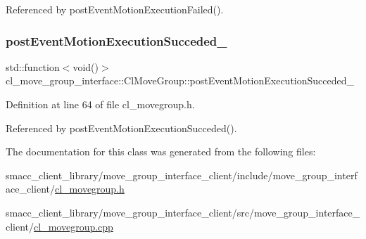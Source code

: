 Referenced by post\+Event\+Motion\+Execution\+Failed().

\mbox{\label{classcl__move__group__interface_1_1ClMoveGroup_a1e95dacf3393a4e4eff40395e8edfccd}} 
\subsubsection{\texorpdfstring{post\+Event\+Motion\+Execution\+Succeded\+\_\+}{postEventMotionExecutionSucceded\_}}
{\footnotesize\ttfamily std\+::function$<$void()$>$ cl\+\_\+move\+\_\+group\+\_\+interface\+::\+Cl\+Move\+Group\+::post\+Event\+Motion\+Execution\+Succeded\+\_\+\hspace{0.3cm}{\ttfamily [private]}}



Definition at line 64 of file cl\+\_\+movegroup.\+h.



Referenced by post\+Event\+Motion\+Execution\+Succeded().



The documentation for this class was generated from the following files\+:\begin{DoxyCompactItemize}
\item 
smacc\+\_\+client\+\_\+library/move\+\_\+group\+\_\+interface\+\_\+client/include/move\+\_\+group\+\_\+interface\+\_\+client/\hyperlink{cl__movegroup_8h}{cl\+\_\+movegroup.\+h}\item 
smacc\+\_\+client\+\_\+library/move\+\_\+group\+\_\+interface\+\_\+client/src/move\+\_\+group\+\_\+interface\+\_\+client/\hyperlink{cl__movegroup_8cpp}{cl\+\_\+movegroup.\+cpp}\end{DoxyCompactItemize}
